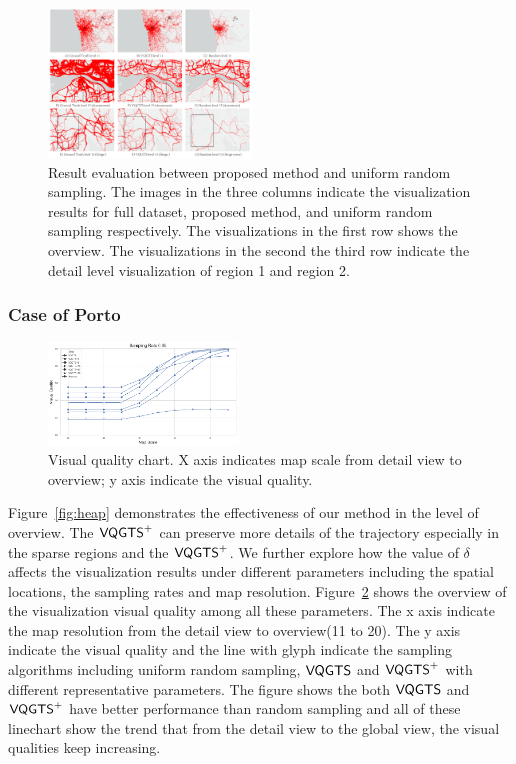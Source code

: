 \begin{figure}[t]
	\centering
	\includegraphics[width=0.48\textwidth]{pictures/experiment_study/Method_resolution_study.pdf}
	\vspace{-5mm}
	\caption{Result evaluation between proposed method and uniform random sampling. The images in the three columns indicate the visualization results for full dataset, proposed method, and uniform random sampling respectively. The visualizations in the first row shows the overview. The visualizations in the second the third row indicate the detail level visualization of region 1 and region 2. }
	\vspace{-5mm}
	\label{fig:random_proposed}
\end{figure}

\subsubsection{Case of Porto}
\begin{figure}[t]
	\centering
	\vspace{2mm}
	\includegraphics[width=0.45\textwidth]{pictures/experiment_study/quanlity.png}
	\caption{Visual quality chart. X axis indicates map scale from detail view to overview; y axis indicate the visual quality. }
	\vspace{0mm}
	\label{fig:quality_chart}
\end{figure}
Figure~\ref{fig:heap} demonstrates the effectiveness of our method in the level of overview. The $\mathsf{VQGTS}^{+}$ can preserve more details of the trajectory especially in the sparse regions and the $\mathsf{VQGTS}^{+}$. We further explore how the value of $\delta$ affects the visualization results under different parameters including the spatial locations, the sampling rates and map resolution. Figure~\ref{fig:quality_chart} shows the overview of the visualization visual quality among all these parameters. The x axis indicate the map resolution from the detail view to overview(11 to 20). The y axis indicate the visual quality and the line with glyph indicate the sampling algorithms including uniform random sampling, $\mathsf{VQGTS}$ and $\mathsf{VQGTS}^{+}$ with different representative parameters. The figure shows the both $\mathsf{VQGTS}$ and $\mathsf{VQGTS}^{+}$ have better performance than random sampling and all of these linechart show the trend that from the detail view to the global view, the visual qualities keep increasing. 


